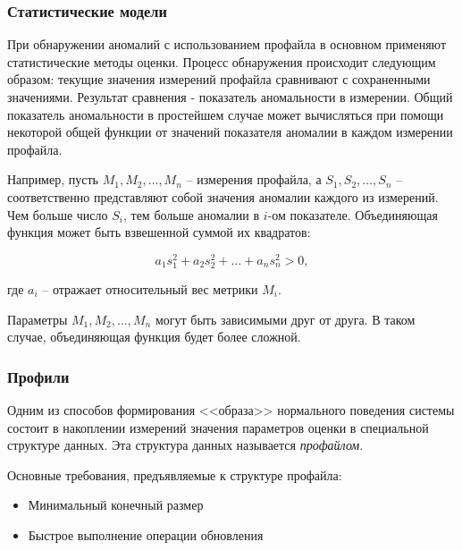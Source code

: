 
\subsubsection*{Статистические модели}

При обнаружении аномалий с использованием профайла в основном применяют статистические методы оценки. Процесс обнаружения происходит следующим образом: текущие значения измерений профайла сравнивают с сохраненными значениями. Результат сравнения - показатель аномальности в измерении. Общий показатель аномальности в простейшем случае может вычисляться при помощи некоторой общей функции от значений показателя аномалии в каждом измерении профайла.

Например, пусть $M_1, M_2, \dots, M_n$ -- измерения профайла, а $S_1, S_2, \dots, S_n$ -- соответственно представляют собой значения аномалии каждого из измерений. Чем больше число $S_i$, тем больше аномалии в $i$-ом показателе. Объединяющая функция может быть взвешенной суммой их квадратов:

\begin{equation}
	a_1s_1^2 + a_2s_2^2 + \dots + a_ns_n^2 > 0,
\end{equation}

где $a_i$ -- отражает относительный вес метрики $M_i$.

Параметры $M_1, M_2, \dots, M_n$ могут быть зависимыми друг от друга. В таком случае, объединяющая функция будет более сложной.

\subsubsection*{Профили}

Одним из способов формирования <<образа>> нормального поведения системы состоит в накоплении измерений значения параметров оценки в специальной структуре данных. Эта структура данных называется \textit{профайлом}. 

Основные требования, предъявляемые к структуре профайла:
\begin{itemize}
	\item Минимальный конечный размер
	\item Быстрое выполнение операции обновления
\end{itemize}

